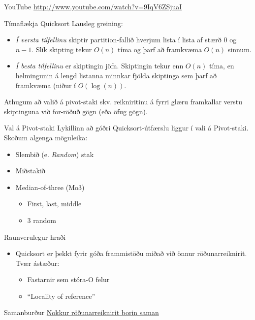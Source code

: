 \documentclass{beamer}
\begin{document}
\begin{frame}{YouTube}
\url{http://www.youtube.com/watch?v=9IqV6ZSjuaI}
\end{frame}

\begin{frame}{Tímaflækja Quicksort}
Lausleg greining:
\begin{itemize}
  \item \emph{Í versta tilfellinu} skiptir partition-fallið hverjum lista í lista af stærð 0 og $n-1$. Slík skipting tekur $O(n)$ tíma og þarf að framkvæma $O(n)$ sinnum.
  \item \emph{Í besta tilfellinu} er skiptingin jöfn. Skiptingin tekur enn $O(n)$ tíma, en helmingunin á lengd listanna minnkar fjölda skiptinga sem þarf að framkvæma (niður í $O(\log(n))$.
\end{itemize}
Athugum að valið á pivot-staki skv. reikniritinu á fyrri glæru framkallar verstu skiptinguna við for-röðuð gögn (eða öfug gögn).
\end{frame}

\begin{frame}{Val á Pivot-staki}
Lykillinn að góðri Quicksort-útfærslu liggur í vali á Pivot-staki. Skoðum algenga möguleika:
\begin{itemize}
 \item Slembið (e. \emph{Random}) stak
 \item Miðstakið
 \item Median-of-three (Mo3)
 \begin{itemize}
  \item First, last, middle
  \item 3 random
 \end{itemize}
\end{itemize}
\end{frame}

\begin{frame}{Raunverulegur hraði}
\begin{itemize}
 \item Quicksort er þekkt fyrir góða frammistöðu miðað við önnur röðunarreiknirit. Tvær ástæður:
 \begin{itemize}
  \item Fastarnir sem stóra-O felur
  \item ``Locality of reference''
 \end{itemize}
\end{itemize}
\end{frame}

\begin{frame}{Samanburður}
\href{https://www.youtube.com/watch?v=ZZuD6iUe3Pc}{Nokkur röðunarreiknirit borin saman}
\end{frame}
\end{document}

